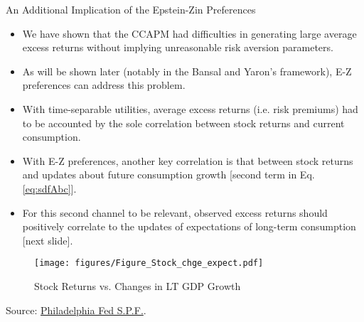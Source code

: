 \begin{frame}{An Additional Implication of the Epstein-Zin Preferences}
\begin{footnotesize}
\begin{itemize}
	\item We have shown that the CCAPM had difficulties in generating large average excess returns without implying unreasonable risk aversion parameters.
	\item As will be shown later (notably in the Bansal and Yaron's framework), E-Z preferences can address this problem.
	\item With time-separable utilities, average excess returns (i.e. risk premiums) had to be accounted by the sole correlation between stock returns and {\color{blue}current consumption}.
	\item With E-Z preferences, another key correlation is that between stock returns and updates about  {\color{blue}future consumption} growth [second term in Eq. \ref{eq:sdfAbc}].
	\item For this second channel to be relevant, observed excess returns should positively correlate to the updates of expectations of long-term consumption [next slide].
	
\end{itemize}
\end{footnotesize}
\end{frame}


\begin{frame}
\begin{center}
\begin{figure}
\caption{Stock Returns vs. Changes in LT GDP Growth}
		\texttt{[image: figures/Figure\_Stock\_chge\_expect.pdf]}
\end{figure}
\begin{scriptsize}

Source: \href{https://www.philadelphiafed.org/research-and-data/real-time-center/survey-of-professional-forecasters/data-files/rgdp10}{Philadelphia Fed S.P.F.}.
\end{scriptsize}
\end{center}
\end{frame}




